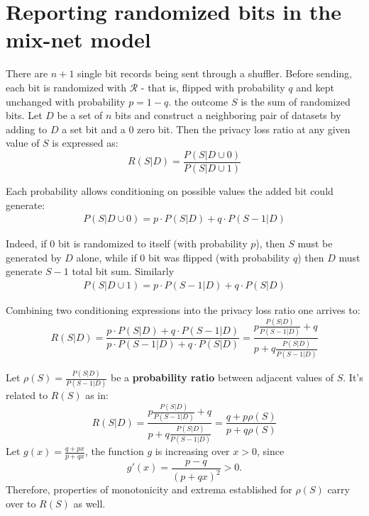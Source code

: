 \documentclass[11pt]{article}
\newcommand{\cR}{\mathcal{R}}
\begin{document}
\section{Reporting randomized bits in the mix-net model}

There are $n+1$ single bit records being sent through a shuffler.  Before sending, each bit is randomized with $\cR$ - that is, flipped with probability $q$  and kept unchanged with probability $p=1-q$.  the outcome $S$ is the sum of randomized bits. Let $D$ be a set of $n$ bits and construct a neighboring pair of datasets by adding to $D$ a set bit and a 0 zero bit.  Then the privacy loss ratio at any given value of $S$ is expressed as:
\begin{equation} \label{eq:} 
R(S|D)= \frac{P(S|D \cup 0)}{P(S|D \cup 1)}
\end{equation}

Each probability allows conditioning on possible values the added bit could generate:
\begin{align}\label{lem:rs100}
P(S|D \cup 0) = p \cdot P(S | D ) + q \cdot P( S - 1 | D) 
\end{align}

Indeed, if $0$ bit is randomized to itself (with probability $p$), then $S$ must be generated by $D$ alone, while if $0$ bit was flipped (with probability $q$) then $D$ must generate $S-1$ total bit sum. Similarly 
\begin{align}
P(S|D \cup 1) = p  \cdot P(S -1 | D ) + q \cdot P( S  | D) 
\end{align}

Combining two conditioning expressions into the privacy loss ratio one arrives to:
\begin{equation} \label{eq:plratio}
R(S|D)=  \frac{p \cdot P(S | D ) + q \cdot P( S - 1 | D) } {  p  \cdot P(S -1 | D ) + q \cdot P( S  | D)  } = \frac{ p \frac{P(S | D )}{P(S - 1| D )} + q } { p + q \frac{P(S | D )}{P(S - 1| D )} }
\end{equation}

Let $\rho(S) = \frac{P(S | D )}{P(S - 1| D )}$ be a \textbf{probability ratio} between adjacent values of $S$.  It's related to $R(S)$ as in:
\begin{equation} \label{eq:plratio1}
R(S|D) =  \frac{ p \frac{P(S | D )}{P(S - 1| D )} + q } { p + q \frac{P(S | D )}{P(S - 1| D )} } = \frac{q + p\rho(S)}{p + q\rho(S)}
\end{equation}
Let $g(x) = \frac{q + px}{p + qx}$, the function $g$ is increasing over $x>0$, since
\[ g'(x) = \frac{p-q}{(p+qx)^2} > 0. \]
Therefore, properties of monotonicity and extrema established for $\rho(S)$  carry over to $R(S)$ as well.
 
\end{document}
